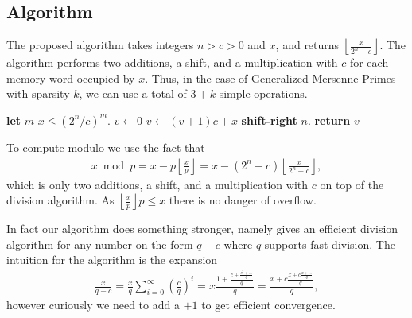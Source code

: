 
\subsection{Algorithm}

The proposed algorithm takes integers $n>c>0$ and $x$, and returns
$\left\lfloor\frac{x}{2^n-c}\right\rfloor$.
The algorithm performs two additions, a shift, and a multiplication with $c$ for each memory word occupied by $x$.
Thus, in the case of Generalized Mersenne Primes with sparsity $k$, we can use a total of $3+k$ simple operations.
\begin{algorithm}
   \begin{algorithmic}[1]
         \State \textbf{let} $m$  $x \le (2^n/c)^m$.
         \State $v \gets 0$
            \State $v \gets (v + 1)c+x$ \textbf{shift-right} $n$.
         \EndFor
         \State\textbf{return} $v$
      \EndProcedure
   \end{algorithmic}
\end{algorithm}




To compute modulo we use the fact that
\begin{align}
   x \bmod p
   = x - p\left\lfloor\frac{x}{p}\right\rfloor
   = x - (2^n - c)\left\lfloor\frac{x}{2^n-c}\right\rfloor,
\end{align}
which is only two additions, a shift, and a multiplication with $c$ on top of the division algorithm.
As $\left\lfloor\frac{x}{p}\right\rfloor p \le x$ there is no danger of overflow.

In fact our algorithm does something stronger, namely gives an efficient division algorithm for any number on the form $q-c$ where $q$ supports fast division.
The intuition for the algorithm is the expansion
\begin{align}
   \frac{x}{q-c}
   = \frac{x}{q}\sum_{i=0}^\infty \left(\frac{c}{q}\right)^i
   = x\frac{1+\frac{c+\frac{c^2 + \dots}{q}}{q}}{q}
   = \frac{x+c\frac{x+c\frac{x + \dots}{q}}{q}}{q},
\end{align}
however curiously we need to add a $+1$ to get efficient convergence.

